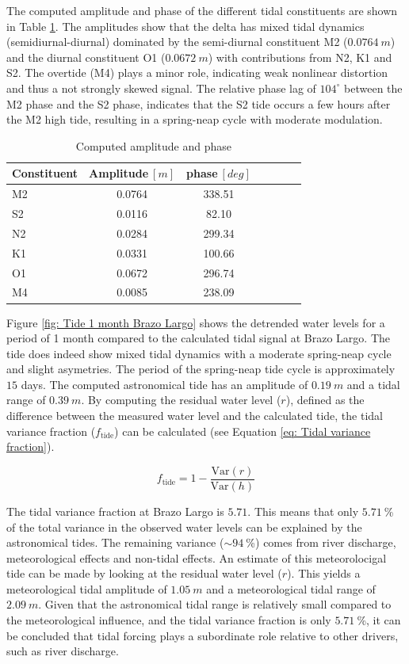 The computed amplitude and phase of the different tidal constituents are shown in Table \ref{tab: computed tidal constituents}. The amplitudes show that the delta has mixed tidal dynamics (semidiurnal-diurnal) dominated by the semi-diurnal constituent M2 ($0.0764~m$) and the diurnal constituent O1 ($0.0672~m$)  with contributions from N2, K1 and S2. The overtide (M4) plays a minor role, indicating weak nonlinear distortion and thus a not strongly skewed signal. The relative phase lag of $104^\circ$  between the M2 phase and the S2 phase, indicates that the S2 tide occurs a few hours after the M2 high tide, resulting in a spring-neap cycle with moderate modulation.

\begin{table}[H]
\centering
\setlength{\tabcolsep}{8pt} 
\caption{Computed amplitude and phase}
\label{tab: computed tidal constituents}
\begin{tabular}{lcccccc}
\hline
Constituent & Amplitude$~[m]$ & phase$~[deg]$ \\
\hline
M2 & 0.0764 & 338.51 \\
S2 & 0.0116 & 82.10 \\
N2 & 0.0284 & 299.34 \\
K1 & 0.0331 & 100.66  \\
O1 & 0.0672 & 296.74 \\
M4 & 0.0085 & 238.09  \\
\hline
\end{tabular}
\end{table}

Figure \ref{fig: Tide 1 month Brazo Largo} shows the detrended water levels for a period of 1 month compared to the calculated tidal signal at Brazo Largo. The tide does indeed show mixed tidal dynamics with a moderate spring-neap cycle and slight asymetries. The period of the spring-neap tide cycle is approximately $15$ days. The computed astronomical tide has an amplitude of $0.19~m$ and a tidal range of $0.39~m$. By computing the residual water level ($r$), defined as the difference between the measured water level and the calculated tide, the tidal variance fraction ($f_\text{tide}$) can be calculated (see Equation \ref{eq: Tidal variance fraction}).

\begin{equation}
    f_{\text{tide}} = 1 - \frac{\mathrm{Var}(r)}{\mathrm{Var}(h)}
    \label{eq: Tidal variance fraction}
\end{equation}

The tidal variance fraction at Brazo Largo is $5.71$. This means that only $5.71~$\% of the total variance in the observed water levels can be explained by the astronomical tides. The remaining variance ($\sim94~$\%) comes from river discharge, meteorological effects and non-tidal effects. An estimate of this meteorolocigal tide can be made by looking at the residual water level ($r$). This yields a meteorological tidal amplitude of $1.05~m$ and a meteorological tidal range of $2.09~m$. Given that the astronomical tidal range is relatively small compared to the meteorological influence, and the tidal variance fraction is only $5.71~$\%, it can be concluded that tidal forcing plays a subordinate role relative to other drivers, such as river discharge.


